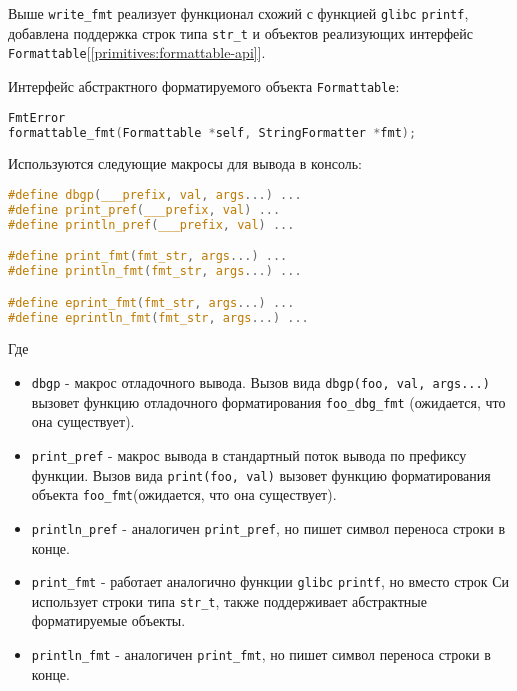 \begin{itemize}
Выше \verb|write_fmt| реализует функционал схожий с функцией \verb|glibc| \verb|printf|, 
добавлена поддержка строк типа \verb|str_t| и объектов реализующих интерфейс \verb|Formattable|[\ref{primitives:formattable-api}].

Интерфейс абстрактного форматируемого объекта \verb|Formattable|:
\begin{lstlisting}[language=c, caption={Интерфейс абстрактного форматируемого объекта}, label={primitives:formattable-api}]
FmtError 
formattable_fmt(Formattable *self, StringFormatter *fmt);
\end{lstlisting}


Используются следующие макросы для вывода в консоль:
\begin{lstlisting}[language=c, caption={Макросы для вывода в консоль}, label={primitives:print-macros}]
#define dbgp(___prefix, val, args...) ...
#define print_pref(___prefix, val) ...
#define println_pref(___prefix, val) ...

#define print_fmt(fmt_str, args...) ...                                 
#define println_fmt(fmt_str, args...) ...                               

#define eprint_fmt(fmt_str, args...) ...                                
#define eprintln_fmt(fmt_str, args...) ...                              
\end{lstlisting}

Где
\begin{itemize}
    \item \verb|dbgp| - макрос отладочного вывода. Вызов вида \newline\verb|dbgp(foo, val, args...)| вызовет функцию отладочного форматирования \verb|foo_dbg_fmt| (ожидается, что она существует).
    \item \verb|print_pref| - макрос вывода в стандартный поток вывода по префиксу функции. Вызов вида \verb|print(foo, val)| вызовет функцию форматирования объекта \verb|foo_fmt|(ожидается, что она существует).
    \item \verb|println_pref| - аналогичен \verb|print_pref|, но пишет символ переноса строки в конце.

    \item \verb|print_fmt| - работает аналогично функции \verb|glibc| \verb|printf|, но вместо строк Си использует строки типа \verb|str_t|, также поддерживает абстрактные форматируемые объекты.
    \item \verb|println_fmt| - аналогичен \verb|print_fmt|, но пишет символ переноса строки в конце.
    

\end{itemize}
\end{itemize}
